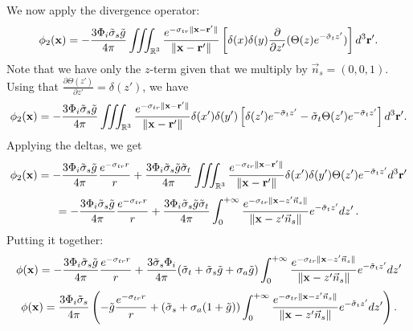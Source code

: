 \documentclass[10pt,a4paper]{article}
\begin{document}
We now apply the divergence operator:
$$
{\phi_2}(\mathbf{x}) = -\frac{3 \Phi_i \tilde{\sigma}_s \tilde{g}}{4 \pi} \iiint_{\mathbb{R}^3}  \frac{e^{-\sigma_{tr} \|\mathbf{x} - \mathbf{r}' \|}}{\|\mathbf{x} - \mathbf{r}' \|} \left[ \delta(x) \delta(y)
\frac{\partial}{\partial z'}  (\Theta(z) e^{-\tilde{\sigma}_t z'}) \right]  d^3 \mathbf{r}'.
$$
Note that we have only the $z$-term given that we multiply by $\vec{n}_s = (0,0,1)$. Using that $\frac{\partial \Theta(z')}{\partial z'} = \delta(z') $, we have
$$
{\phi_2}(\mathbf{x}) = -\frac{3 \Phi_i \tilde{\sigma}_s \tilde{g}}{4 \pi} \iiint_{\mathbb{R}^3}  \frac{e^{-\sigma_{tr} \|\mathbf{x} - \mathbf{r}' \|}}{\|\mathbf{x} - \mathbf{r}' \|}  \delta(x') \delta(y') \left[
\delta(z') e^{-\tilde{\sigma}_t z'} - \tilde{\sigma}_t \Theta(z') e^{-\tilde{\sigma}_t z'} \right]  d^3 \mathbf{r}'.
$$
Applying the deltas, we get
$$
{\phi_2}(\mathbf{x}) = -\frac{3 \Phi_i \tilde{\sigma}_s \tilde{g}}{4 \pi} \frac{e^{-\sigma_{tr} r}}{r} +\frac{3 \Phi_i \tilde{\sigma}_s \tilde{g} \tilde{\sigma}_t}{4 \pi} \iiint_{\mathbb{R}^3}  \frac{e^{-\sigma_{tr} \|\mathbf{x} - \mathbf{r}' \|}}{\|\mathbf{x} - \mathbf{r}'\|} \delta(x') \delta(y') \Theta(z') e^{-\tilde{\sigma}_t z'}  d^3 \mathbf{r}'
$$
$$
= -\frac{3 \Phi_i \tilde{\sigma}_s \tilde{g}}{4 \pi} \frac{e^{-\sigma_{tr} r}}{r} +\frac{3 \Phi_i \tilde{\sigma}_s \tilde{g} \tilde{\sigma}_t}{4 \pi} \int_{0}^{+\infty} \frac{e^{-\sigma_{tr} \|\mathbf{x} - z' \vec{n}_s\|}}{\|\mathbf{x} - z' \vec{n}_s\|}  e^{-\tilde{\sigma}_t z'} dz' \, .
$$
Putting it together:
$$
{\phi}(\mathbf{x}) = -\frac{3 \Phi_i \tilde{\sigma}_s \tilde{g}}{4 \pi} \frac{e^{-\sigma_{tr} r}}{r} + \frac{3\tilde{\sigma}_s \Phi_i}{4 \pi} (\tilde{\sigma}_t + \tilde{\sigma}_s \tilde{g} + \sigma_a  \tilde{g} ) \int_{0}^{+\infty} \frac{e^{-\sigma_{tr} \|\mathbf{x} - z' \vec{n}_s\|}}{\|\mathbf{x} - z' \vec{n}_s\|}  e^{-\tilde{\sigma}_t z'}  dz'
$$
\begin{equation}
{\phi}(\mathbf{x}) = \frac{3 \Phi_i \tilde{\sigma}_s}{4 \pi} \left(-\tilde{g} \frac{e^{-\sigma_{tr} r}}{r} + (\tilde{\sigma}_s + \sigma_a  ( 1 + \tilde{g})) \int_{0}^{+\infty} \frac{e^{-\sigma_{tr} \|\mathbf{x} - z' \vec{n}_s\|}}{\|\mathbf{x} - z' \vec{n}_s\|}  e^{-\tilde{\sigma}_t z'} dz' \right) .
\label{eq:phi}
\end{equation}
\end{document}
